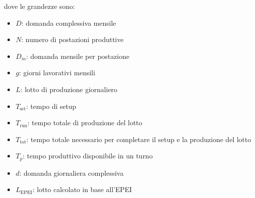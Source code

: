 \documentclass[11pt]{article}
\begin{document}
\vspace{1em}
\noindent
dove le grandezze sono:
\begin{itemize}
    \item $D$: domanda complessiva mensile
    \item $N$: numero di postazioni produttive
    \item $D_m$: domanda mensile per postazione
    \item $g$: giorni lavorativi mensili
    \item $L$: lotto di produzione giornaliero
    \item $T_\text{set}$: tempo di setup
    \item $T_\text{run}$: tempo totale di produzione del lotto
    \item $T_\text{tot}$: tempo totale necessario per completare il setup e la produzione del lotto
    \item $T_p$: tempo produttivo disponibile in un turno
    \item $d$: domanda giornaliera complessiva
    \item $L_{\text{EPEI}}$: lotto calcolato in base all'EPEI
\end{itemize}
\newpage
\end{document}
